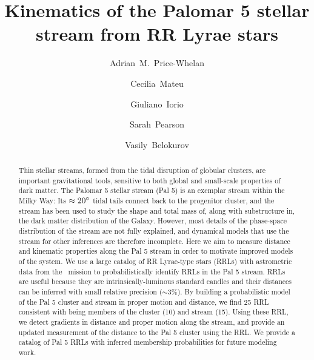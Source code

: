 \documentclass[twocolumn]{aastex63}
\begin{document}
\title{Kinematics of the Palomar 5 stellar stream from RR Lyrae stars}

\author[0000-0003-0872-7098]{Adrian~M.~Price-Whelan}

\author[0000-0002-6330-2394]{Cecilia~Mateu}


\author{Giuliano~Iorio}

\author[0000-0003-0256-5446]{Sarah~Pearson}

\author{Vasily~Belokurov}



\begin{abstract}
Thin stellar streams, formed from the tidal disruption of globular clusters, are important gravitational tools, sensitive to both global and small-scale properties of dark matter.
The Palomar 5 stellar stream (Pal 5) is an exemplar stream within the Milky Way: Its $\approx 20\mbox{$^\circ$}$ tidal tails connect back to the progenitor cluster, and the stream has been used to study the shape and total mass of, along with substructure in, the dark matter distribution of the Galaxy.
However, most details of the phase-space distribution of the stream are not fully explained, and dynamical models that use the stream for other inferences are therefore incomplete.
Here we aim to measure distance and kinematic properties along the Pal 5 stream in order to motivate improved models of the system. %
We use a large catalog of RR Lyrae-type stars (RRLs) with astrometric data from the \Gaia\ mission to probabilistically identify RRLs in the Pal 5 stream.
RRLs are useful because they are intrinsically-luminous standard candles and their distances can be inferred with small relative precision ($\sim3\%$).
By building a probabilistic model of the Pal 5 cluster and stream in proper motion and distance, we find 25 RRL consistent with being members of the cluster (10) and stream (15).
Using these RRL, we detect gradients in distance and proper motion along the stream, and provide an updated measurement of the distance to the Pal 5 cluster using the RRL.
We provide a catalog of Pal 5 RRLs with inferred membership probabilities for future modeling work.
\end{abstract}
\end{document}
